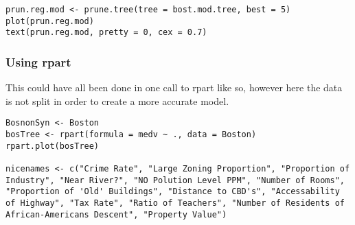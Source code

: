 \documentclass[12pt]{article}
\begin{document}
\begin{lstlisting}
prun.reg.mod <- prune.tree(tree = bost.mod.tree, best = 5)
plot(prun.reg.mod)
text(prun.reg.mod, pretty = 0, cex = 0.7)
\end{lstlisting}

\hypertarget{using-rpart}{%
\subsubsection{Using rpart}\label{using-rpart}}

This could have all been done in one call to rpart like so, however here
the data is not split in order to create a more accurate model.

\begin{lstlisting}
BosnonSyn <- Boston
bosTree <- rpart(formula = medv ~ ., data = Boston)
rpart.plot(bosTree)

nicenames <- c("Crime Rate", "Large Zoning Proportion", "Proportion of Industry", "Near River?", "NO Polution Level PPM", "Number of Rooms", "Proportion of 'Old' Buildings", "Distance to CBD's", "Accessability of Highway", "Tax Rate", "Ratio of Teachers", "Number of Residents of African-Americans Descent", "Property Value")
\end{lstlisting}
 
\end{document}
